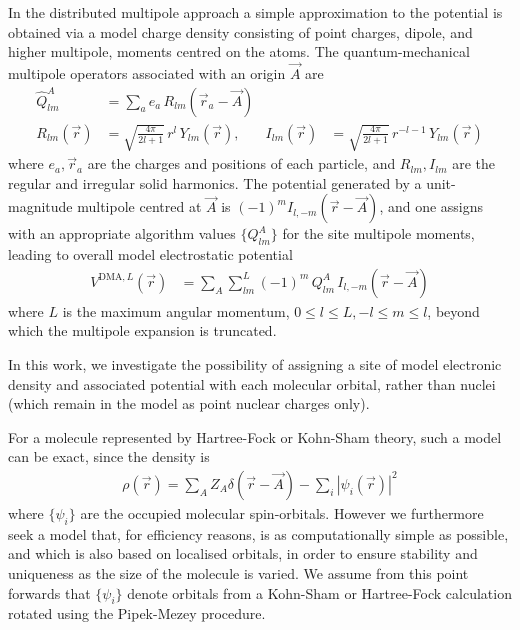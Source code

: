 \documentclass[journal=jacsat,manuscript=article]{achemso}
\begin{document}
In the distributed multipole approach\cite{Stone1981,Stone1985DistributedAnalysis,Stone2005DistributedSets.} a simple approximation to the potential is
obtained via  a model charge density consisting of point charges, dipole, and higher multipole, moments centred on the atoms.
The quantum-mechanical multipole operators associated with an origin $\vec A$ are\cite{Stone2013}
\begin{align}
    \hat Q_{lm}^A &= \sum_a e_a\, R_{lm}(\vec r_a-\vec A)
    \\
R_{lm}(\vec r)&=\sqrt{\frac{4\pi}{2l+1}}\,r^l \, Y_{lm}(\vec r)
,&
I_{lm}(\vec r)&=\sqrt{\frac{4\pi}{2l+1}}\,r^{-l-1} \, Y_{lm}(\vec r)
\end{align}
where
$e_a, \vec r_a$ are the charges and positions of each particle, and 
$R_{lm}, I_{lm}$ are the regular and irregular solid harmonics\cite{Whittaker1927, Stone2013}.
The potential generated by a unit-magnitude multipole  centred at $\vec A$ is
    $ (-1)^m I_{l,-m}(\vec r-\vec A)$,
and one assigns
with an appropriate algorithm\cite{Stone1981,Stone1985DistributedAnalysis,Stone2005DistributedSets.}
values $\{Q^A_{lm}\}$ for the site multipole moments, leading to overall model electrostatic potential
\begin{align}
    V^{\text{DMA},L}(\vec r) &= \sum_A \sum_{lm}^L(-1)^m\, Q^A_{lm}\, I_{l,-m}(\vec r-\vec A)
\end{align}
where $L$ is the
maximum angular momentum, $0\le l\le L, -l\le m\le l$, beyond which the multipole expansion is truncated.

In this work, we investigate the possibility of assigning a site of model electronic density and associated potential with each molecular orbital, rather than nuclei (which remain in the model as point nuclear charges only).

For a molecule represented by Hartree-Fock or Kohn-Sham theory, such a model can be exact, since the density is
\begin{align}
    \rho(\vec r) = \sum_A Z_A \delta(\vec r - \vec A)
    -\sum_i |\psi_i(\vec r)|^2
\end{align}
where $\{\psi_i\}$ are the occupied molecular spin-orbitals.
However we furthermore seek a model that, for efficiency reasons, is as computationally
simple as possible, and which is also based on localised orbitals, in order
to ensure stability and uniqueness as the size of the molecule is varied. We assume
from this point forwards that $\{\psi_i\}$ denote orbitals from a Kohn-Sham
or Hartree-Fock calculation rotated using the Pipek-Mezey procedure\cite{Pipek1989a}.
\end{document}
